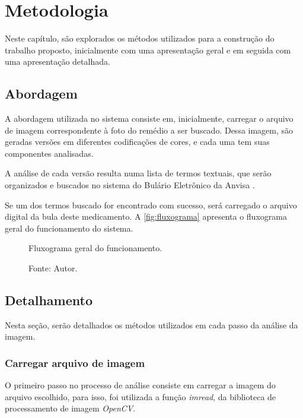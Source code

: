 \chapter{Metodologia}\label{cap:metodologia}


Neste capítulo, são explorados os métodos utilizados para a construção do trabalho proposto, inicialmente com uma apresentação geral e em seguida com uma apresentação detalhada.

\section{Abordagem}

A abordagem utilizada no sistema consiste em, inicialmente, carregar o arquivo de imagem correspondente à foto do remédio a ser buscado.
Dessa imagem, são geradas versões em diferentes codificações de cores, e cada uma tem suas componentes analisadas.

A análise de cada versão resulta numa lista de termos textuais, que serão organizados e buscados no sistema do Bulário Eletrônico da \ac{Anvisa} \cite{anvisa2020bulario}.

Se um dos termos buscado for encontrado com sucesso, será carregado o arquivo digital da bula deste medicamento.
A \autoref{fig:fluxograma} apresenta o fluxograma geral do funcionamento do sistema.

\begin{figure}[htbp]
    \centering
    \caption{Fluxograma geral do funcionamento.}
    
    \caption*{Fonte: Autor.}
    \label{fig:fluxograma}
\end{figure}

\section{Detalhamento}

Nesta seção, serão detalhados os métodos utilizados em cada passo da análise da imagem.

\subsection{Carregar arquivo de imagem}\label{ssec:carregar}

O primeiro passo no processo de análise consiste em carregar a imagem do arquivo escolhido, para isso, foi utilizada a função \textit{imread}, da biblioteca de processamento de imagem \textit{OpenCV}.

